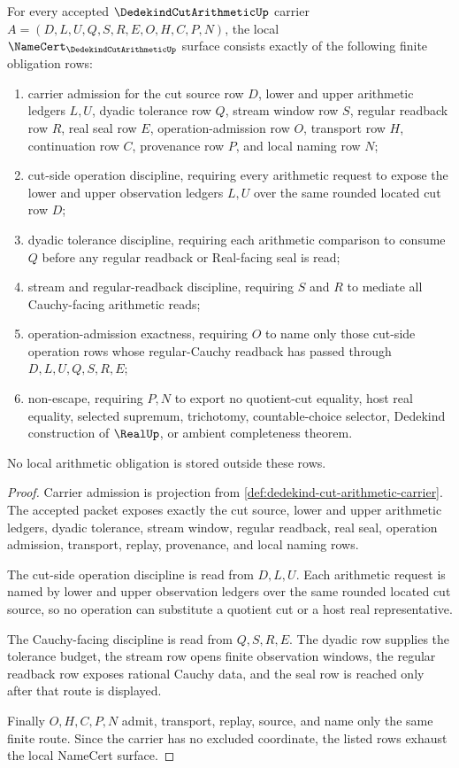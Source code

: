 \begin{theorem}
\label{thm:dedekind-cut-arithmetic-namecert-obligations}
For every accepted $\DedekindCutArithmeticUp$ carrier $A=(D,L,U,Q,S,R,E,O,H,C,P,N)$, the local $\NameCert_{\DedekindCutArithmeticUp}$ surface consists exactly of the following finite obligation rows:
\begin{enumerate}
\item carrier admission for the cut source row $D$, lower and upper arithmetic ledgers $L,U$, dyadic tolerance row $Q$, stream window row $S$, regular readback row $R$, real seal row $E$, operation-admission row $O$, transport row $H$, continuation row $C$, provenance row $P$, and local naming row $N$;
\item cut-side operation discipline, requiring every arithmetic request to expose the lower and upper observation ledgers $L,U$ over the same rounded located cut row $D$;
\item dyadic tolerance discipline, requiring each arithmetic comparison to consume $Q$ before any regular readback or Real-facing seal is read;
\item stream and regular-readback discipline, requiring $S$ and $R$ to mediate all Cauchy-facing arithmetic reads;
\item operation-admission exactness, requiring $O$ to name only those cut-side operation rows whose regular-Cauchy readback has passed through $D,L,U,Q,S,R,E$;
\item non-escape, requiring $P,N$ to export no quotient-cut equality, host real equality, selected supremum, trichotomy, countable-choice selector, Dedekind construction of $\RealUp$, or ambient completeness theorem.
\end{enumerate}
No local arithmetic obligation is stored outside these rows.
\end{theorem}
\begin{proof}
Carrier admission is projection from \autoref{def:dedekind-cut-arithmetic-carrier}. The accepted packet exposes exactly the cut source, lower and upper arithmetic ledgers, dyadic tolerance, stream window, regular readback, real seal, operation admission, transport, replay, provenance, and local naming rows.

The cut-side operation discipline is read from $D,L,U$. Each arithmetic request is named by lower and upper observation ledgers over the same rounded located cut source, so no operation can substitute a quotient cut or a host real representative.

The Cauchy-facing discipline is read from $Q,S,R,E$. The dyadic row supplies the tolerance budget, the stream row opens finite observation windows, the regular readback row exposes rational Cauchy data, and the seal row is reached only after that route is displayed.

Finally $O,H,C,P,N$ admit, transport, replay, source, and name only the same finite route. Since the carrier has no excluded coordinate, the listed rows exhaust the local NameCert surface.
\end{proof}

